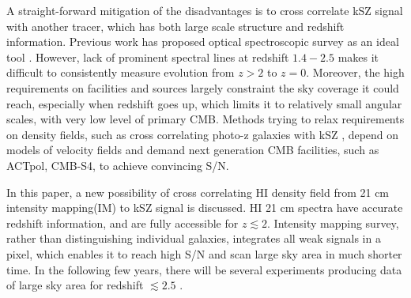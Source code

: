 A straight-forward mitigation of the disadvantages is to cross correlate 
kSZ signal with another tracer, which has both large scale structure and redshift information. 
Previous work has proposed optical spectroscopic survey as an ideal tool \cite{Hand12,Shao11,Li14}. 
However, lack of prominent spectral lines at redshift $1.4-2.5$ 
makes it difficult to consistently measure evolution from $z>2$ to $z=0$. 
Moreover, the high requirements on facilities and sources 
largely constraint the sky coverage it could reach, 
especially when redshift goes up, 
which limits it to relatively small angular scales, 
with very low level of primary CMB. 
%
Methods trying to relax requirements on density fields, such as 
cross correlating photo-z galaxies with kSZ \cite{Hill16,Ferraro16}, 
depend on models of velocity fields and   
demand next generation CMB facilities, such as  
ACTpol, CMB-S4, 
to achieve 
convincing S/N.


In this paper, a new possibility of cross correlating HI density field from 21 cm intensity mapping(IM) to kSZ signal is discussed. 
HI 21 cm spectra have accurate redshift information, 
and are fully accessible for $z\lesssim2$.  
Intensity mapping survey, 
rather than distinguishing individual galaxies, 
integrates all weak signals in a pixel,  
which enables it to reach high S/N and scan large sky area 
in much shorter time. 
In the following few years, there will be several experiments 
producing data of large sky area for redshift $\lesssim2.5$ 
\cite{2014CHIME, TIANLAI, HIRAX}.

